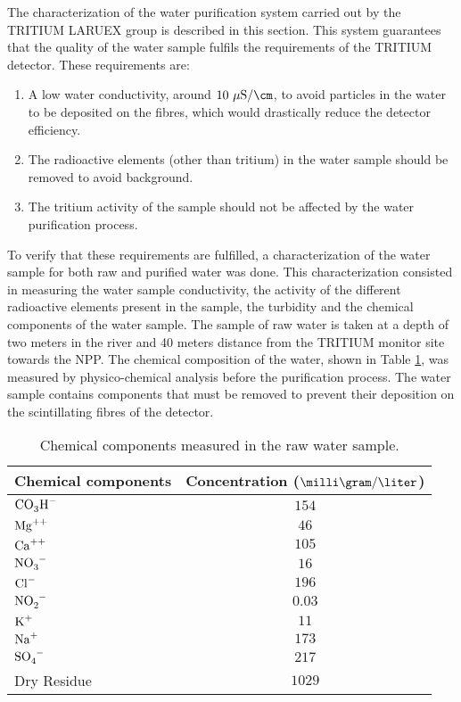 The characterization of the water purification system carried out by the TRITIUM LARUEX group is described in this section. This system guarantees that the quality of the water sample fulfils the requirements of the TRITIUM detector. These requirements are:

\begin{enumerate}
\item{} A low water conductivity, around $10~\mu\text{S}/\cm$, to avoid particles in the water to be deposited on the fibres, which would drastically reduce the detector efficiency.

\item{} The radioactive elements (other than tritium) in the water sample should be removed to avoid background.

\item{} The tritium activity of the sample should not be affected by the water purification process. 

\end{enumerate}

To verify that these requirements are fulfilled, a characterization of the water sample for both raw and purified water was done. This characterization consisted in measuring the water sample conductivity, the activity of the different radioactive elements present in the sample, the turbidity and the chemical components of the water sample. The sample of raw water is taken at a depth of two meters in the river and 40 meters distance from the TRITIUM monitor site towards the NPP. The chemical composition of the water, shown in Table \ref{tab:ChemicalComponentsRawWater}, was measured by physico-chemical analysis before the purification process. The water sample contains components that must be removed to prevent their deposition on the scintillating fibres of the detector.

\begin{table}[htbp]
\centering{}%
\begin{tabular}{lc}
\toprule 
Chemical components & Concentration ($\milli\gram/\liter$) \tabularnewline
\midrule
\midrule 
$\ce{CO_{3}H^-}$ & $154$ \tabularnewline
$\ce{Mg^{++}}$ & $46$ \tabularnewline
$\ce{Ca^{++}}$ & $105$ \tabularnewline
$\ce{NO_{3}^-}$ & $16$ \tabularnewline
$\ce{Cl^-}$ & $196$ \tabularnewline
$\ce{NO_{2}^-}$ & $0.03$ \tabularnewline
$\ce{K^{+}}$ & $11$ \tabularnewline
$\ce{Na^{+}}$ & $173$ \tabularnewline
$\ce{SO_{4}^-}$ & $217$ \tabularnewline
Dry Residue & $1029$ \tabularnewline
\bottomrule
\end{tabular}
\caption{Chemical components measured in the raw water sample.}
\label{tab:ChemicalComponentsRawWater}
\end{table}


